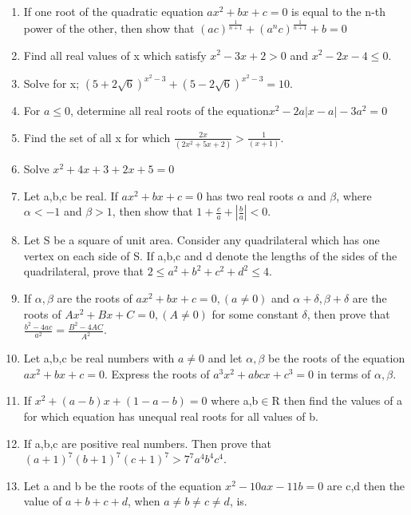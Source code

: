 \begin{enumerate}[label=\arabic*.,ref=\thesubsection.\theenumi]
\item If one root of the quadratic equation $ax^2+bx+c=0$ is equal to the n-th power of the other, then show that $(ac)^{\frac{1}{n+1}}+(a^nc)^{\frac{1}{n+1}}+b=0$

\item Find all real values of x which satisfy $x^2-3x+2>0$ and $x^2-2x-4\leq0$.

\item Solve for x;  $(5+2\sqrt{6})^{x^2-3}+(5-2\sqrt6)^{x^2-3}=10$.

\item For $a\leq0$, determine all real roots of the equation$x^2-2a|x-a|-3a^2=0$

\item Find the set of all x for which $\frac{2x}{(2x^2+5x+2)}>\frac{1}{(x+1)}$.

\item Solve ${x^2+4x+3}+2x+5=0$

\item Let a,b,c be real. If $ax^2+bx+c=0$ has two real roots $\alpha$ and $\beta$, where $\alpha<-1$ and $\beta>1$, then show that $1+\frac{c}{a}+|\frac{b}{a}|<0$.

\item Let S be a square of unit area. Consider any quadrilateral which has one vertex on each side of S. If a,b,c and d denote the lengths of the sides of the quadrilateral, prove that $2\leq{a}^2+b^2+c^2+d^2\leq4$.

\item If $\alpha,\beta$ are the roots of $ax^2+bx+c=0, (a\neq0)$ and $\alpha+\delta,\beta+\delta$ are the roots of $Ax^2+Bx+C=0, (A\neq0)$ for some constant $\delta$, then prove that $\frac{b^2-4ac}{a^2}=\frac{B^2-4AC}{A^2}$.

\item Let a,b,c be real numbers with $a\neq0$ and let $\alpha,\beta$ be the roots of the equation $ax^2+bx+c=0$. Express the roots of $a^3x^2+abcx+c^3=0$ in terms of $\alpha,\beta$.

\item If $x^2+(a-b)x+(1-a-b)=0$ where a,b$\in$R then find the values of a for which equation has unequal real roots for all values of b.

\item If a,b,c are positive real numbers. Then prove that $(a+1)^7(b+1)^7(c+1)^7>7^7a^4b^4c^4$.

\item Let a and b be the roots of the equation $x^2-10ax-11b=0$ are c,d then the value of $a+b+c+d$, when $a\neq{b}\neq{c}\neq{d}$, is.


\end{enumerate}
